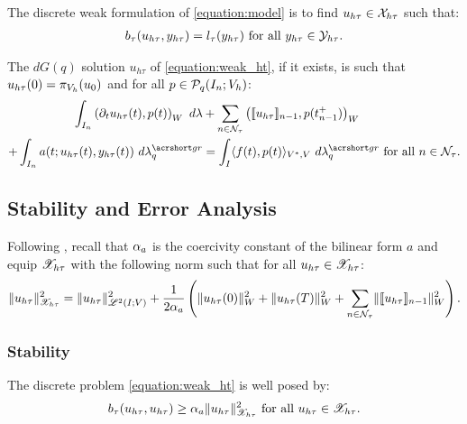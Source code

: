 \begin{definition}
    The discrete weak formulation of \cref{equation:model} is to find $u_{h \tau} \in \mathcal{X}_{h \tau}$ such that:
    \begin{gather} \label{equation:weak_ht}
        b_{\tau}(u_{h \tau}, y_{h \tau}) = l_{\tau}(y_{h \tau}) \text{ for all } y_{h \tau} \in \mathcal{Y}_{h \tau}.
    \end{gather}
\end{definition}

\begin{proposition}[Localization]
    The $dG(q)$ solution $u_{h \tau}$ of \cref{equation:weak_ht}, if it exists, is such that $u_{h \tau}(0) = \pi_{V_h}(u_0)$ and for all $p \in \mathcal{P}_{q}(I_n; V_h)$:
    \begin{align}
        \int_{I_n} \left( \partial_t u_{h \tau}(t), p(t) \right)_W ~ d \lambda & + \sum_{n \in \TimeIndices} \left( \llbracket u_{h \tau} \rrbracket_{n - 1}, p(t_{n - 1}^+) \right)_W \notag \\
        + \int_{I_n} a(t; u_{h \tau}(t), y_{h \tau}(t)) ~ d \lambdaGR_q & = \int_I \langle f(t), p(t) \rangle_{V^*, V} ~ d \lambdaGR_q \text{ for all } n \in \TimeIndices.
    \end{align}
\end{proposition}

\newpage
\subsection{Stability and Error Analysis}

Following \cite[p. 186]{Ern2021}, recall that $\alpha_{a}$ is the coercivity constant of the bilinear form $a$ and equip $\mathscr{X}_{h \tau}$ with the following norm such that for all $u_{h \tau} \in \mathscr{X}_{h \tau}$:
\begin{gather}
    \lVert u_{h \tau} \rVert_{\mathscr{X}_{h \tau}}^2 = \lVert u_{h \tau} \rVert_{\mathscr{L}^{2}(I; V)}^2 + \frac{1}{2 \alpha_{a}} \left( \lVert u_{h \tau}(0) \rVert_W^2 + \lVert u_{h \tau}(T) \rVert_W^2 + \sum_{n \in \mathcal{N}_{\tau}} \lVert \llbracket u_{h \tau} \rrbracket_{n - 1} \rVert_W^2 \right).
\end{gather}

\subsubsection{Stability}

\begin{lemma}[Coercivity]
    The discrete problem \cref{equation:weak_ht} is well posed by:
    \begin{gather}
        b_{\tau}(u_{h \tau}, u_{h \tau}) \geq \alpha_{a} \lVert u_{h \tau} \rVert_{\mathscr{X}_{h \tau}}^2 \text{ for all } u_{h \tau} \in \mathscr{X}_{h \tau}.
    \end{gather}
\end{lemma}

